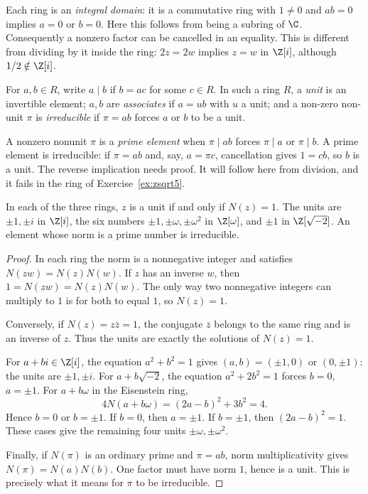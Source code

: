 Each ring is an \emph{integral domain}: it is a commutative ring with
$1\ne0$ and $ab=0$ implies $a=0$ or $b=0$. Here this follows from
being a subring of $\C$. Consequently a nonzero factor can be cancelled
in an equality. This is different from dividing by it inside the ring:
$2z=2w$ implies $z=w$ in $\Z[i]$, although $1/2\notin\Z[i]$.

For $a,b\in R$, write $a\mid b$ if $b=ac$ for some $c\in R$. In such a ring $R$, a \emph{unit} is an invertible element; $a,b$ are \emph{associates} if $a=ub$ with $u$ a unit; and a non-zero non-unit $\pi$ is \emph{irreducible} if $\pi=ab$ forces $a$ or $b$ to be a unit.

A nonzero nonunit $\pi$ is a \emph{prime element} when $\pi\mid ab$
forces $\pi\mid a$ or $\pi\mid b$. A prime element is irreducible:
if $\pi=ab$ and, say, $a=\pi c$, cancellation gives $1=cb$, so
$b$ is a unit. The reverse implication needs proof. It will follow here
from division, and it fails in the ring of Exercise~\ref{ex:zsqrt5}.

\begin{proposition}\label{prop:quadunits}
In each of the three rings, $z$ is a unit if and only if $N(z)=1$. The units are $\pm1,\pm i$ in $\Z[i]$, the six numbers $\pm1,\pm\omega,\pm\omega^2$ in $\Z[\omega]$, and $\pm1$ in $\Z[\sqrt{-2}]$. An element whose norm is a prime number is irreducible.
\end{proposition}
\begin{proof}
In each ring the norm is a nonnegative integer
and satisfies $N(zw)=N(z)N(w)$.
If $z$ has an inverse $w$, then
$1=N(zw)=N(z)N(w)$.
The only way two nonnegative integers can
multiply to $1$ is for both to equal $1$,
so $N(z)=1$.

Conversely, if $N(z)=z\bar z=1$,
the conjugate $\bar z$ belongs to the
same ring and is an inverse of $z$.
Thus the units are exactly the
solutions of $N(z)=1$.

For $a+bi\in\Z[i]$, the equation
$a^2+b^2=1$ gives $(a,b)=(\pm1,0)$
or $(0,\pm1)$: the units are $\pm1,\pm i$.
For $a+b\sqrt{-2}$, the equation
$a^2+2b^2=1$ forces $b=0$, $a=\pm1$.
For $a+b\omega$ in the Eisenstein ring,
\[
4N(a+b\omega)=(2a-b)^2+3b^2=4.
\]
Hence $b=0$ or $b=\pm1$.
If $b=0$, then $a=\pm1$.
If $b=\pm1$, then $(2a-b)^2=1$.
These cases give the remaining four
units $\pm\omega,\pm\omega^2$.

Finally, if $N(\pi)$ is an ordinary prime
and $\pi=ab$, norm multiplicativity gives
$N(\pi)=N(a)N(b)$. One factor must have
norm $1$, hence is a unit. This is precisely
what it means for $\pi$ to be irreducible.
\end{proof}

